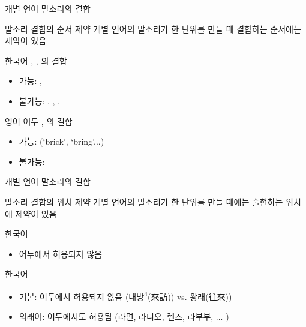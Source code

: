 \documentclass[11pt, aspectratio=169]{beamer}
\newcommand{\textds}[1]{{\ipafont #1}}
\begin{document}
\begin{frame}[t]{개별 언어 말소리의 결합}
    \begin{block}{말소리 결합의 순서 제약}
        개별 언어의 말소리가 한 단위를 만들 때 결합하는 순서에는 제약이 있음
    \end{block}
    \begin{block}{{한국어 \textds{[m]}, \textds{[u]}, \textds{[n]}의 결합}}
        \begin{itemize}
            \item 가능: \textds{[mun]}, \textds{[num]}
            \item 불가능: \textds{[mnu]}, \textds{[nmu]}, \textds{[umn]}, \textds{[unm]}
        \end{itemize}        
    \end{block}
    \begin{block}{{영어 어두 \textds{[b]}, \textds{[r]}의 결합}}
        \begin{itemize}
            \item 가능: \textds{[br]} (‘brick’, ‘bring’...)
            \item 불가능: \textds{[rb]}
        \end{itemize}
    \end{block}    
\end{frame}

\begin{frame}[t]{개별 언어 말소리의 결합}
    \begin{block}{말소리 결합의 위치 제약}
        개별 언어의 말소리가 한 단위를 만들 때에는 출현하는 위치에 제약이 있음
    \end{block}
    \begin{block}{한국어 \textds{[ŋ]}}
        \begin{itemize}
            \item 어두에서 허용되지 않음
        \end{itemize}
    \end{block}
    \begin{block}{한국어 \textds{[ɾ]}}
        \begin{itemize}
            \item 기본: 어두에서 허용되지 않음 (내방\textsuperscript{4}(來訪)) vs. 왕래(往來))
            \item 외래어: 어두에서도 허용됨 (라면, 라디오, 렌즈, 라부부, ... )
        \end{itemize}
    \end{block}
\end{frame}
\end{document}
